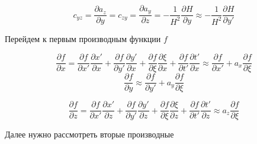 \begin{equation*}
    c_{yz}
    =
    \frac
        {\partial a_z}
        {\partial y}
    =
    c_{zy}
    =
    \frac
        {\partial a_y}
        {\partial z}
    =
    -
    \frac
        {1}
        {H^2}
    \frac
        {\partial H}
        {\partial y}
    \approx
    -
    \frac
        {1}
        {H^2}
    \frac
        {\partial H}
        {\partial y'}
\end{equation*}

Перейдем к первым производным функции $f$

\begin{equation*}
    \frac
        {\partial f}
        {\partial x}
    =
    \frac
        {\partial f}
        {\partial x'}
    \frac
        {\partial x'}
        {\partial x}
    +
    \frac
        {\partial f}
        {\partial y'}
    \frac
        {\partial y'}
        {\partial x}
    +
    \frac
        {\partial f}
        {\partial \xi}
    \frac
        {\partial \xi}
        {\partial x}
    +
    \frac
        {\partial f}
        {\partial t'}
    \frac
        {\partial t'}
        {\partial x}
    \approx
    \frac
        {\partial f}
        {\partial x'}
    +
    a_{x}
    \frac
        {\partial f}
        {\partial \xi}
\end{equation*}
\begin{equation*}
    \frac
        {\partial f}
        {\partial y}
    \approx
    \frac
        {\partial f}
        {\partial y'}
    +
    a_{y}
    \frac
        {\partial f}
        {\partial \xi}
\end{equation*}

\begin{equation*}
    \frac
        {\partial f}
        {\partial z}
    =
    \frac
        {\partial f}
        {\partial x'}
    \frac
        {\partial x'}
        {\partial z}
    +
    \frac
        {\partial f}
        {\partial y'}
    \frac
        {\partial y'}
        {\partial z}
    +
    \frac
        {\partial f}
        {\partial \xi}
    \frac
        {\partial \xi}
        {\partial z}
    +
    \frac
        {\partial f}
        {\partial t'}
    \frac
        {\partial t'}
        {\partial z}
    \approx
    a_{z}
    \frac
        {\partial f}
        {\partial \xi}
\end{equation*}

Далее нужно рассмотреть вторые производные

